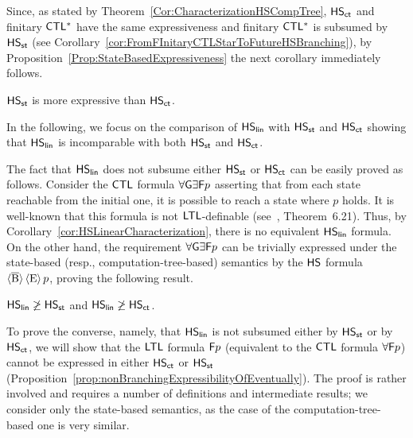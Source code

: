 Since, as stated by  Theorem~\ref{Cor:CharacterizationHSCompTree}, $\text{\sffamily HS}_{\mathsf{ct}}$ and finitary $\text{\sffamily CTL$^{*}$}$ have the same expressiveness and finitary $\text{\sffamily CTL$^{*}$}$ is subsumed by $\text{\sffamily HS}_{\mathsf{st}}$ (see Corollary~\ref{cor:FromFInitaryCTLStarToFutureHSBranching}), by Proposition~\ref{Prop:StateBasedExpressiveness} the next corollary immediately follows.

\begin{corollary} $\text{\sffamily HS}_{\mathsf{st}}$ is more expressive than $\text{\sffamily HS}_{\mathsf{ct}}$.
\end{corollary}

In the following, we focus on the comparison of $\text{\sffamily HS}_{\mathsf{lin}}$ with $\text{\sffamily HS}_{\mathsf{st}}$ and $\text{\sffamily HS}_{\mathsf{ct}}$ showing that $\text{\sffamily HS}_{\mathsf{lin}}$ is incomparable with both $\text{\sffamily HS}_{\mathsf{st}}$ and $\text{\sffamily HS}_{\mathsf{ct}}$. 

The fact that  $\text{\sffamily HS}_{\mathsf{lin}}$ does not subsume either $\text{\sffamily HS}_{\mathsf{st}}$ or $\text{\sffamily HS}_{\mathsf{ct}}$ can be easily proved as follows. Consider the $\text{\sffamily CTL}$ formula $\forall \textsf{G} \exists \textsf{F} p$ asserting that from each state reachable from the initial one, it is possible to reach a state where $p$ holds. It is well-known that this formula is not $\text{\sffamily LTL}$-definable (see~\cite{Baier2008}, Theorem~6.21). Thus, by Corollary~\ref{cor:HSLinearCharacterization}, there is no equivalent $\text{\sffamily HS}_{\mathsf{lin}}$ formula. On the other hand, the requirement $\forall \textsf{G} \exists \textsf{F} p$ can be trivially expressed under the state-based (resp., computation-tree-based) semantics by the $\text{\sffamily HS}$ formula $\operatorname{\langle \overline{B}\rangle}\operatorname{\langle E\rangle} p $, proving the following result.

\begin{proposition}\label{prop:nonBranchingExpressibilityOfLinearTime} $\text{\sffamily HS}_{\mathsf{lin}} \not \geq \text{\sffamily HS}_{\mathsf{st}}$ and $\text{\sffamily HS}_{\mathsf{lin}} \not \geq \text{\sffamily HS}_{\mathsf{ct}}$.
\end{proposition}

To prove the converse, namely, that $\text{\sffamily HS}_{\mathsf{lin}}$ is not subsumed either by $\text{\sffamily HS}_{\mathsf{st}}$ or by $\text{\sffamily HS}_{\mathsf{ct}}$, 
we will show that the $\text{\sffamily LTL}$ formula $\textsf{F} p$ (equivalent to the $\text{\sffamily CTL}$ formula $\forall \textsf{F} p$)
cannot be expressed in either $\text{\sffamily HS}_{\mathsf{ct}}$ or $\text{\sffamily HS}_{\mathsf{st}}$ (Proposition~\ref{prop:nonBranchingExpressibilityOfEventually}). The proof is rather involved and requires a number of definitions and intermediate results; we consider only
the state-based semantics, as the case of the computation-tree-based one is very similar. 

